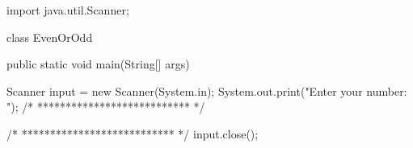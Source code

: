 \documentclass[answers,addpoints]{exam} %
\begin{document}
\begin{questions}
\begin{code}
import java.util.Scanner;

class EvenOrOdd {
    public static void main(String[] args) {
    	Scanner input = new Scanner(System.in);
	System.out.print("Enter your number: ");
   	/* *************************** */

 
 
 
 
 
 
 	/* *************************** */
 	input.close(); 
    }
}
\end{code}

\begin{solution}
\end{solution}

\end{questions}
\end{document}
